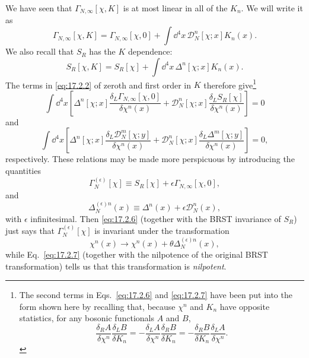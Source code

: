 We have seen that $\Gamma_{N,\infty}[\chi,K]$ is at most linear in all of the $K_n$. We will write it as
\begin{equation}
\Gamma_{N,\infty}[\chi,K]=\Gamma_{N,\infty}[\chi,0]
+\int \dd^4x\,\mathcal D_N^n[\chi;x]K_n(x).
\tag{17.2.5}\label{eq:17.2.5}
\end{equation}
We also recall that $S_R$ has the $K$ dependence:
\[
S_R[\chi,K]=S_R[\chi]+\int \dd^4x\,\Delta^n[\chi;x]K_n(x).
\]
The terms in \eqref{eq:17.2.2} of zeroth and first order in $K$ therefore give\footnote{The second terms in Eqs.~\eqref{eq:17.2.6} and \eqref{eq:17.2.7} have been put into the form shown here by recalling that, because $\chi^n$ and $K_n$ have opposite statistics, for any bosonic functionals $A$ and $B$, \[ \frac{\delta_RA}{\delta\chi^n}\frac{\delta_LB}{\delta K_n} =-\frac{\delta_LA}{\delta\chi^n}\frac{\delta_RB}{\delta K_n} =-\frac{\delta_RB}{\delta K_n}\frac{\delta_LA}{\delta\chi^n}. \]}
\begin{equation}
\int \dd^4x\left[
\Delta^n[\chi;x]\frac{\delta_L\Gamma_{N,\infty}[\chi,0]}{\delta\chi^n(x)}
+\mathcal D_N^n[\chi;x]\frac{\delta_LS_R[\chi]}{\delta\chi^n(x)}
\right]=0
\tag{17.2.6}\label{eq:17.2.6}
\end{equation}
and
\begin{equation}
\int \dd^4x\left[
\Delta^n[\chi;x]\frac{\delta_L\mathcal D_N^m[\chi;y]}{\delta\chi^n(x)}
+\mathcal D_N^n[\chi;x]\frac{\delta_L\Delta^m[\chi;y]}{\delta\chi^n(x)}
\right]=0,
\tag{17.2.7}\label{eq:17.2.7}
\end{equation}
respectively. These relations may be made more perspicuous by introducing the quantities
\begin{equation}
\Gamma_N^{(\epsilon)}[\chi]\equiv S_R[\chi]+\epsilon\Gamma_{N,\infty}[\chi,0],
\tag{17.2.8}\label{eq:17.2.8}
\end{equation}
and
\begin{equation}
\Delta_N^{(\epsilon)n}(x)\equiv\Delta^n(x)+\epsilon\mathcal D_N^n(x),
\tag{17.2.9}\label{eq:17.2.9}
\end{equation}
with $\epsilon$ infinitesimal. Then \eqref{eq:17.2.6} (together with the BRST invariance of $S_R$) just says that $\Gamma_N^{(\epsilon)}[\chi]$ is invariant under the transformation
\begin{equation}
\chi^n(x)\longrightarrow\chi^n(x)+\theta\Delta_N^{(\epsilon)n}(x),
\tag{17.2.10}\label{eq:17.2.10}
\end{equation}
while Eq.~\eqref{eq:17.2.7} (together with the nilpotence of the original BRST transformation) tells us that this transformation is \emph{nilpotent}.

